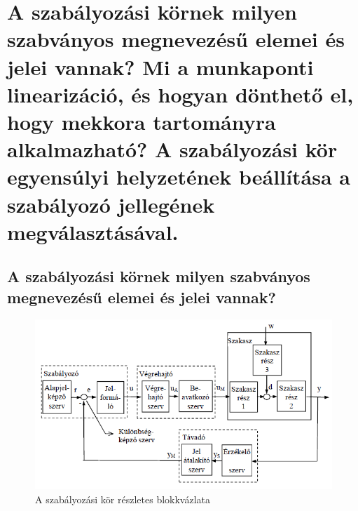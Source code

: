 \documentclass[11pt,a4paper]{article}
\begin{document}
\section{A szabályozási körnek milyen szabványos megnevezésű elemei és jelei vannak? Mi a munkaponti linearizáció, és hogyan dönthető el, hogy mekkora tartományra alkalmazható? A szabályozási kör egyensúlyi helyzetének beállítása a szabályozó jellegének megválasztásával.}
\subsection{A szabályozási körnek milyen szabványos megnevezésű elemei és jelei vannak?}
\begin{figure}[hbtp]
    	 \centering
		\includegraphics[scale=0.8]{20_szabalyozas_blokk.png}
		\caption{A szabályozási kör részletes blokkvázlata}
\end{figure}
\end{document}
